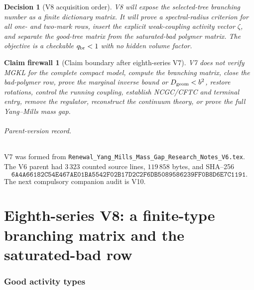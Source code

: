 \documentclass[11pt,oneside]{book}
\newtheorem{firewall}[theorem]{Claim firewall}
\newtheorem{decision}[theorem]{Decision}
\theoremstyle{definition}
\theoremstyle{remark}
\begin{document}
\begin{decision}[V8 acquisition order]
\label{dec:e8v7-V8}
V8 will expose the selected-tree branching number as a finite
dictionary matrix.  It will prove a spectral-radius criterion for
all one- and two-mark rows, insert the explicit weak-coupling
activity vector \(\zeta\), and separate the good-tree matrix from the
saturated-bad polymer matrix.  The objective is a checkable
\(q_{\rm br}<1\) with no hidden volume factor.
\end{decision}

\begin{firewall}[Claim boundary after eighth-series V7]
\label{fire:e8v7-claim}
V7 does not verify MGKL for the complete compact model, compute the
branching matrix, close the bad-polymer row, prove the marginal
inverse bound or \(D_{\rm geom}<b^2\), restore rotations, control the
running coupling, establish NCGC/CFTC and terminal entry, remove the
regulator, reconstruct the continuum theory, or prove the full
Yang--Mills mass gap.
\end{firewall}

\paragraph{Parent-version record.}
V7 was formed from
\texttt{Renewal\_Yang\_Mills\_Mass\_Gap\_Research\_Notes\_V6.tex}.
The V6 parent had \(3\,323\) counted source lines,
\(119\,858\) bytes, and SHA--256
\[
\texttt{6A4A66182C54E467AE01BA5542F02B17D2C2F6DB5089586239FF0B8D6E7C1191}.
\]
The next compulsory companion audit is V10.



\part{Eighth-series V8: a finite-type branching matrix and the
saturated-bad row}
\label{part:e8v8}

\section{Good activity types}
\label{sec:e8v8-good-types}
\end{document}
